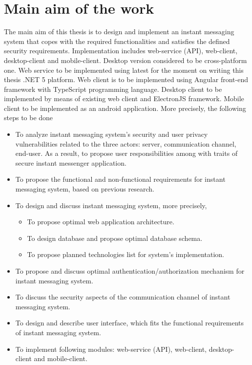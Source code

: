 \chapter{Main aim of the work}\label{ch:main-aim-of-the-work}

The main aim of this thesis is to design and implement an instant messaging system
that copes with the required functionalities and satisfies the defined security requirements.
Implementation includes web-service (API), web-client, desktop-client and mobile-client.
Desktop version considered to be cross-platform one.
Web service to be implemented using latest for the moment on writing this thesis .NET 5 platform.
Web client is to be implemented using Angular front-end framework with TypeScript programming language.
Desktop client to be implemented by means of existing web client and ElectronJS framework.
Mobile client to be implemented as an android application.
More precisely, the following steps to be done
\begin{itemize}
    \item To analyze instant messaging system's security and user privacy vulnerabilities related to the three
    actors: server, communication channel, end-user.
    As a result, to propose user responsibilities among with traits of secure instant messenger application.
    \item To propose the functional and non-functional requirements for instant messaging system, based on previous
    research.
    \item To design and discuss instant messaging system, more precisely,
    \begin{itemize}
        \item To propose optimal web application architecture.
        \item To design database and propose optimal database schema.
        \item To propose planned technologies list for system's implementation.
    \end{itemize}
    \item To propose and discuss optimal authentication/authorization mechanism for instant messaging system.
    \item To discuss the security aspects of the communication channel of instant messaging system.
    \item To design and describe user interface, which fits the functional requirements of instant messaging system.
    \item To implement following modules: web-service (API), web-client, desktop-client and mobile-client.
\end{itemize}